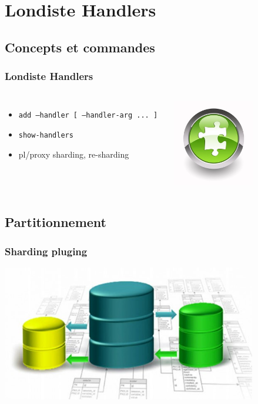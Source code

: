 \documentclass{beamer}
\begin{document}
\section{Londiste Handlers}
\subsection{Concepts et commandes}

\begin{frame}[fragile]
  \frametitle{Londiste Handlers}

  \vfill

\begin{columns}[c]

  \begin{itemize}
    \item \texttt{add --handler [ --handler-arg ... ] }
    \item \texttt{show-handlers}
    \item pl/proxy sharding, re-sharding
  \end{itemize}

\begin{center}
  \includegraphics[height=1.5in]{plugin.jpg}
\end{center}
\end{columns}
\end{frame}

\subsection{Partitionnement}

\begin{frame}[fragile]
  \frametitle{Sharding pluging}

  \begin{center}
    \includegraphics[height=16em] {partitioning-in-podtgre-590x314.jpg}
  \end{center}
\end{frame}
\end{document}
